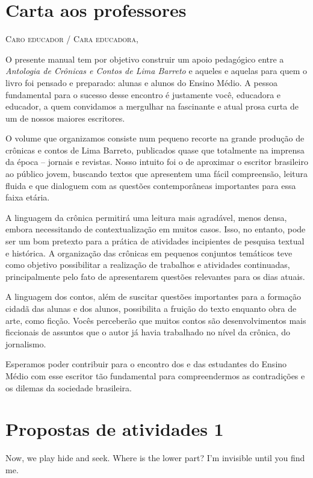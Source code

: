 \section{Carta aos professores}

\textsc{Caro educador / Cara educadora,}\bigskip

O presente manual tem por objetivo construir um apoio pedagógico
entre a \emph{Antologia de Crônicas e Contos de Lima Barreto} e aqueles
e aquelas para quem o livro foi pensado e preparado: alunas e alunos do
Ensino Médio. A pessoa fundamental para o sucesso desse encontro é
justamente você, educadora e educador, a quem convidamos a mergulhar na
fascinante e atual prosa curta de um de nossos maiores escritores.

O volume que organizamos consiste num pequeno recorte na grande
produção de crônicas e contos de Lima Barreto, publicados quase que
totalmente na imprensa da época -- jornais e revistas. Nosso intuito foi
o de aproximar o escritor brasileiro ao público jovem, buscando textos
que apresentem uma fácil compreensão, leitura fluida e que dialoguem com
as questões contemporâneas importantes para essa faixa etária.

A linguagem da crônica permitirá uma leitura mais agradável,
menos densa, embora necessitando de contextualização em muitos casos.
Isso, no entanto, pode ser um bom pretexto para a prática de atividades
incipientes de pesquisa textual e histórica. A organização das crônicas
em pequenos conjuntos temáticos teve como objetivo possibilitar a
realização de trabalhos e atividades continuadas, principalmente pelo
fato de apresentarem questões relevantes para os dias atuais.

A linguagem dos contos, além de suscitar questões importantes
para a formação cidadã das alunas e dos alunos, possibilita a fruição do
texto enquanto obra de arte, como ficção. Vocês perceberão que muitos
contos são desenvolvimentos mais ficcionais de assuntos que o autor já
havia trabalhado no nível da crônica, do jornalismo.

Esperamos poder contribuir para o encontro dos e das estudantes
do Ensino Médio com esse escritor tão fundamental para compreendermos as
contradições e os dilemas da sociedade brasileira.

\section{Propostas de atividades 1}

\begin{tcolorbox}[colback=yellow!10!white,
				  colframe=red!75!black,
				  lowerbox=invisible]

  Now, we play hide and seek. Where is the lower part?
  \tcblower
  I'm invisible until you find me.
\end{tcolorbox}

